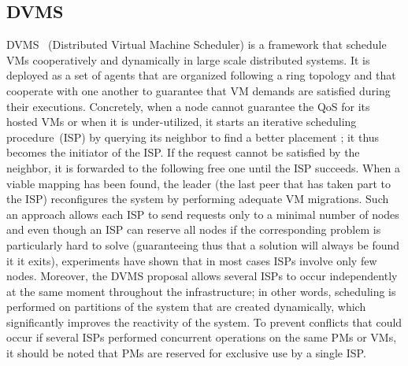 

\subsection{DVMS}
\label{ssec:dvms}

DVMS~\cite{quesnel:ispa2013,quesnel:cpe2012}
(Distributed Virtual Machine Scheduler) is a framework that schedule VMs
cooperatively and dynamically in large scale distributed
systems. It is deployed as a set of agents that are organized following a ring
topology and that cooperate with one another to guarantee that VM demands are satisfied during their executions. 
Concretely, when a node cannot guarantee the QoS for its hosted VMs or when it is
under-utilized, it starts an iterative scheduling procedure~(ISP) by querying
its neighbor to find a better placement ; it thus becomes the initiator of the ISP.
If the request cannot be satisfied by the neighbor, it is forwarded to the
following free one until the ISP succeeds. When a viable mapping has been
found, the leader (\ie the last peer that has taken part to the ISP) reconfigures 
the system by performing adequate VM migrations.
Such an approach allows each ISP to send requests only to a minimal number of
nodes and even though an ISP can reserve all nodes if the corresponding problem
is particularly hard to solve (guaranteeing thus that a solution will always be
found it it exits), experiments have shown that in most cases ISPs involve only
few nodes.  Moreover, the DVMS proposal allows several ISPs to occur
independently at the same moment throughout the infrastructure; in other words,
scheduling is performed on partitions of the system that are created
dynamically, which significantly improves the reactivity of the system.  To
prevent conflicts that could occur if several ISPs performed concurrent
operations on the same PMs or VMs, it should be noted that PMs are reserved for
exclusive use by a single ISP. 

